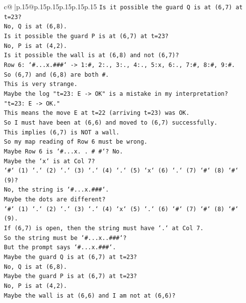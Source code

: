 \documentclass{article}
\begin{document}
{\begin{supertabular}{c@{$\;$}|p{.15\linewidth}@{}p{.15\linewidth}p{.15\linewidth}p{.15\linewidth}p{.15\linewidth}p{.15\linewidth}}
{{{\texttt{Is it possible the guard Q is at (6,7) at t=23?} \\
\texttt{No, Q is at (6,8).} \\
\texttt{Is it possible the guard P is at (6,7) at t=23?} \\
\texttt{No, P is at (4,2).} \\
\texttt{Is it possible the wall is at (6,8) and not (6,7)?} \\
\texttt{Row 6: `\#...x.\#\#\#` {-}> 1:\#, 2:., 3:., 4:., 5:x, 6:., 7:\#, 8:\#, 9:\#.} \\
\texttt{So (6,7) and (6,8) are both \#.} \\
\texttt{This is very strange.} \\
\texttt{Maybe the log "t=23: E {-}> OK" is a mistake in my interpretation?} \\
\texttt{"t=23: E {-}> OK."} \\
\texttt{This means the move E at t=22 (arriving t=23) was OK.} \\
\texttt{So I must have been at (6,6) and moved to (6,7) successfully.} \\
\texttt{This implies (6,7) is NOT a wall.} \\
\texttt{So my map reading of Row 6 must be wrong.} \\
\texttt{Maybe Row 6 is `\#...x. . \# \#`? No.} \\
\texttt{Maybe the `x` is at Col 7?} \\
\texttt{`\#` (1) `.` (2) `.` (3) `.` (4) `.` (5) `x` (6) `.` (7) `\#` (8) `\#` (9)?} \\
\texttt{No, the string is `\#...x.\#\#\#`.} \\
\texttt{Maybe the dots are different?} \\
\texttt{`\#` (1) `.` (2) `.` (3) `.` (4) `x` (5) `.` (6) `\#` (7) `\#` (8) `\#` (9).} \\
\texttt{If (6,7) is open, then the string must have `.` at Col 7.} \\
\texttt{So the string must be `\#...x..\#\#\#`?} \\
\texttt{But the prompt says `\#...x.\#\#\#`.} \\
\texttt{Maybe the guard Q is at (6,7) at t=23?} \\
\texttt{No, Q is at (6,8).} \\
\texttt{Maybe the guard P is at (6,7) at t=23?} \\
\texttt{No, P is at (4,2).} \\
\texttt{Maybe the wall is at (6,6) and I am not at (6,6)?} \\
}}}
\end{supertabular}}
\end{document}
